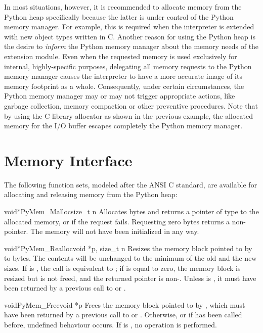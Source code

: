 \documentclass{manual}
\begin{document}
In most situations, however, it is recommended to allocate memory from
the Python heap specifically because the latter is under control of
the Python memory manager. For example, this is required when the
interpreter is extended with new object types written in C. Another
reason for using the Python heap is the desire to \emph{inform} the
Python memory manager about the memory needs of the extension module.
Even when the requested memory is used exclusively for internal,
highly-specific purposes, delegating all memory requests to the Python
memory manager causes the interpreter to have a more accurate image of
its memory footprint as a whole. Consequently, under certain
circumstances, the Python memory manager may or may not trigger
appropriate actions, like garbage collection, memory compaction or
other preventive procedures. Note that by using the C library
allocator as shown in the previous example, the allocated memory for
the I/O buffer escapes completely the Python memory manager.


\section{Memory Interface \label{memoryInterface}}

The following function sets, modeled after the ANSI C standard, are
available for allocating and releasing memory from the Python heap:


\begin{cfuncdesc}{void*}{PyMem_Malloc}{size_t n}
Allocates  bytes and returns a pointer of type  to
the allocated memory, or \NULL{} if the request fails.  Requesting zero
bytes returns a non-\NULL{} pointer.
The memory will not have been initialized in any way.
\end{cfuncdesc}

\begin{cfuncdesc}{void*}{PyMem_Realloc}{void *p, size_t n}
Resizes the memory block pointed to by  to  bytes. The
contents will be unchanged to the minimum of the old and the new
sizes. If  is \NULL{}, the call is equivalent to
; if  is equal to zero, the
memory block is resized but is not freed, and the returned pointer is
non-\NULL{}.  Unless  is \NULL{}, it must have been returned by
a previous call to  or
.
\end{cfuncdesc}

\begin{cfuncdesc}{void}{PyMem_Free}{void *p}
Frees the memory block pointed to by , which must have been
returned by a previous call to  or
.  Otherwise, or if
 has been called before, undefined behaviour
occurs. If  is \NULL{}, no operation is performed.
\end{cfuncdesc}
\end{document}
